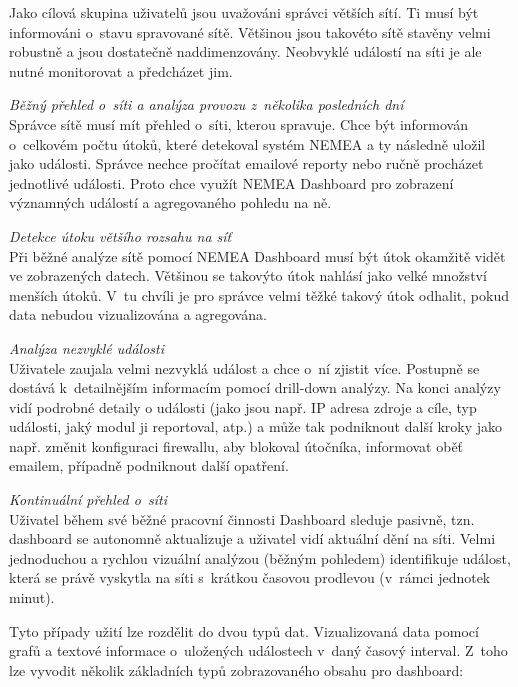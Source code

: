 Jako cílová skupina uživatelů jsou uvažováni správci větších sítí. Ti musí být informováni o~stavu spravované sítě. Většinou jsou takovéto sítě stavěny velmi robustně a jsou dostatečně naddimenzovány. Neobvyklé událostí na síti je ale nutné monitorovat a předcházet jim.

\label{sec:aud}

\begin{description}
    \item \textit{Běžný přehled o~síti a analýza provozu z~několika posledních dní} \\
        Správce sítě musí mít přehled o~síti, kterou spravuje. Chce být informován o~celkovém počtu útoků, které detekoval systém NEMEA a ty následně uložil jako události. Správce nechce pročítat emailové reporty nebo ručně procházet jednotlivé události. Proto chce využít NEMEA Dashboard pro zobrazení významných událostí a agregovaného pohledu na ně.
    \item \textit{Detekce útoku většího rozsahu na síť} \\
        Při běžné analýze sítě pomocí NEMEA Dashboard musí být útok okamžitě vidět ve zobrazených datech. Většinou se takovýto útok nahlásí jako velké množství menších útoků. V~tu chvíli je pro správce velmi těžké takový útok odhalit, pokud data nebudou vizualizována a agregována.
    \item \textit{Analýza nezvyklé události} \\
        Uživatele zaujala velmi nezvyklá událost a chce o~ní zjistit více. Postupně se dostává k~detailnějším informacím pomocí drill-down analýzy. Na konci analýzy vidí podrobné detaily o události (jako jsou např. IP adresa zdroje a cíle, typ události, jaký modul ji reportoval, atp.) a může tak podniknout další kroky jako např. změnit konfiguraci firewallu, aby blokoval útočníka, informovat oběť emailem, případně podniknout další opatření.
    \item \textit{Kontinuální přehled o~síti} \\
        Uživatel během své běžné pracovní činnosti Dashboard sleduje pasivně, tzn. dashboard se autonomně aktualizuje a uživatel vidí aktuální dění na síti. Velmi jednoduchou a rychlou vizuální analýzou (běžným pohledem) identifikuje událost, která se právě vyskytla na síti s~krátkou časovou prodlevou (v~rámci jednotek minut).
        
\end{description}

Tyto případy užití lze rozdělit do dvou typů dat. Vizualizovaná data pomocí grafů a textové informace o~uložených událostech v~daný časový interval. Z~toho lze vyvodit několik základních typů zobrazovaného obsahu pro dashboard:

